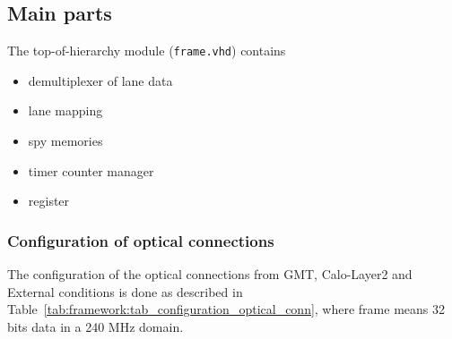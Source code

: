 \clearpage

\subsection{Main parts}

The top-of-hierarchy module (\texttt{frame.vhd}) contains
\begin {itemize}
\item demultiplexer of lane data
\item lane mapping
\item spy memories
\item timer counter manager
\item register
\end {itemize}

\subsubsection{Configuration of optical connections} \label{sec:framework:sec_configuration_optical_conn}
The configuration of the optical connections from GMT, Calo-Layer2 and External conditions is done as described in Table~\ref{tab:framework:tab_configuration_optical_conn}, where frame means 32 bits data in a 240 MHz domain.

